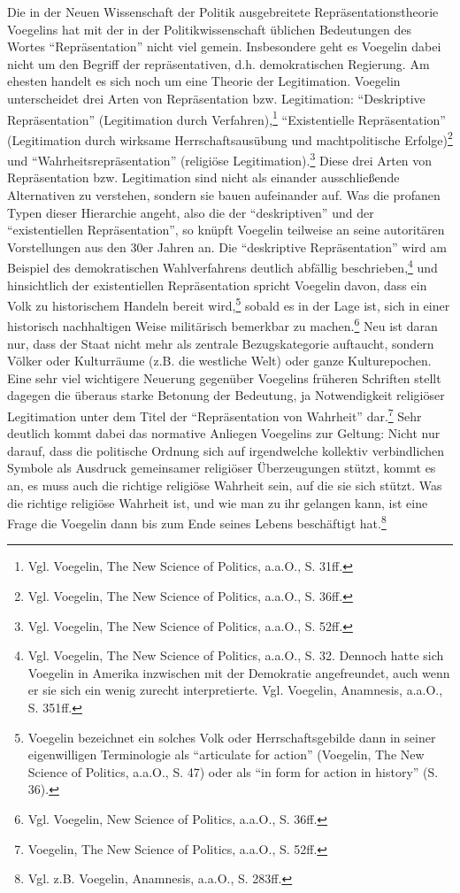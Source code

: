 \documentclass[12pt,a4paper,ngerman]{article}
\begin{document}
Die in der Neuen Wissenschaft der Politik ausgebreitete Repräsentationstheorie
Voegelins hat mit der in der Politikwissenschaft üblichen Bedeutungen des
Wortes "`Repräsentation"' nicht viel gemein.  Insbesondere geht es Voegelin
dabei nicht um den Begriff der repräsentativen, d.h. demokratischen Regierung.
Am ehesten handelt es sich noch um eine Theorie der Legitimation.  Voegelin
unterscheidet drei Arten von Repräsentation bzw.  Legitimation: "`Deskriptive
Repräsentation"' (Legitimation durch Verfahren),\footnote{Vgl. Voegelin, The
  New Science of Politics, a.a.O., S. 31ff.} "`Existentielle Repräsentation"'
(Legitimation durch wirksame Herrschaftsausübung und machtpolitische
Erfolge)\footnote{Vgl. Voegelin, The New Science of Politics, a.a.O., S.
  36ff.} und "`Wahrheitsrepräsentation"' (religiöse
Legitimation).\footnote{Vgl. Voegelin, The New Science of Politics, a.a.O., S.
  52ff.}  Diese drei Arten von Repräsentation bzw.  Legitimation sind nicht
als einander ausschließende Alternativen zu verstehen, sondern sie bauen
aufeinander auf.  Was die profanen Typen dieser Hierarchie angeht, also die
der "`deskriptiven"' und der "`existentiellen Repräsentation"', so knüpft
Voegelin teilweise an seine autoritären Vorstellungen aus den 30er Jahren an.
Die "`deskriptive Repräsentation"' wird am Beispiel des demokratischen
Wahlverfahrens deutlich abfällig beschrieben,\footnote{Vgl. Voegelin, The New
  Science of Politics, a.a.O., S. 32.  Dennoch hatte sich Voegelin in Amerika
  inzwischen mit der Demokratie angefreundet, auch wenn er sie sich ein wenig
  zurecht interpretierte. Vgl. Voegelin, Anamnesis, a.a.O., S. 351ff.} und
hinsichtlich der existentiellen Repräsentation spricht Voegelin davon, dass
ein Volk zu historischem Handeln bereit wird,\footnote{Voegelin bezeichnet ein
  solches Volk oder Herrschaftsgebilde dann in seiner eigenwilligen
  Terminologie als "`articulate for action"' (Voegelin, The New Science of
  Politics, a.a.O., S. 47) oder als "`in form for action in history"' (S.
  36).}  sobald es in der Lage ist, sich in einer historisch nachhaltigen
Weise militärisch bemerkbar zu machen.\footnote{Vgl. Voegelin, New Science of
  Politics, a.a.O., S. 36ff.} Neu ist daran nur, dass der Staat nicht mehr als
zentrale Bezugskategorie auftaucht, sondern Völker oder Kulturräume (z.B.  die
westliche Welt) oder ganze Kulturepochen. Eine sehr viel wichtigere Neuerung
gegenüber Voegelins früheren Schriften stellt dagegen die überaus starke
Betonung der Bedeutung, ja Notwendigkeit religiöser Legitimation unter dem
Titel der "`Repräsentation von Wahrheit"' dar.\footnote{Voegelin, The New
  Science of Politics, a.a.O., S. 52ff.} Sehr deutlich kommt dabei das
normative Anliegen Voegelins zur Geltung: Nicht nur darauf, dass die
politische Ordnung sich auf irgendwelche kollektiv verbindlichen Symbole als
Ausdruck gemeinsamer religiöser Überzeugungen stützt, kommt es an, es muss
auch die richtige religiöse Wahrheit sein, auf die sie sich stützt.  Was die
richtige religiöse Wahrheit ist, und wie man zu ihr gelangen kann, ist eine
Frage die Voegelin dann bis zum Ende seines Lebens beschäftigt
hat.\footnote{Vgl. z.B. Voegelin, Anamnesis, a.a.O., S.  283ff.}
\end{document}
